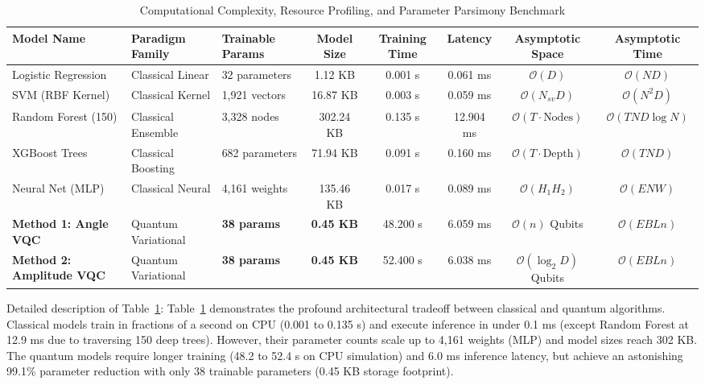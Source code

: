 \documentclass{ieeeaccess}
\begin{document}
\begin{table}[!t]
\caption{Computational Complexity, Resource Profiling, and Parameter Parsimony Benchmark}
\label{tab:computational_footprint}
\centering
\begin{tabular*}{\textwidth}{@{\extracolsep{\fill}}lllccccc@{}}
\toprule
\textbf{Model Name} & \textbf{Paradigm Family} & \textbf{Trainable Params} & \textbf{Model Size} & \textbf{Training Time} & \textbf{Latency} & \textbf{Asymptotic Space} & \textbf{Asymptotic Time} \\
\midrule
Logistic Regression         & Classical Linear   & 32 parameters      & 1.12 KB   & 0.001 s   & 0.061 ms  & $\mathcal{O}(D)$           & $\mathcal{O}(ND)$ \\
SVM (RBF Kernel)            & Classical Kernel   & 1,921 vectors      & 16.87 KB  & 0.003 s   & 0.059 ms  & $\mathcal{O}(N_{sv}D)$     & $\mathcal{O}(N^2 D)$ \\
Random Forest (150)         & Classical Ensemble & 3,328 nodes        & 302.24 KB & 0.135 s   & 12.904 ms & $\mathcal{O}(T \cdot \text{Nodes})$ & $\mathcal{O}(TND \log N)$ \\
XGBoost Trees               & Classical Boosting & 682 parameters     & 71.94 KB  & 0.091 s   & 0.160 ms  & $\mathcal{O}(T \cdot \text{Depth})$ & $\mathcal{O}(TND)$ \\
Neural Net (MLP)            & Classical Neural   & 4,161 weights      & 135.46 KB & 0.017 s   & 0.089 ms  & $\mathcal{O}(H_1 H_2)$     & $\mathcal{O}(ENW)$ \\
\midrule
\textbf{Method 1: Angle VQC}& Quantum Variational& \textbf{38 params} & \textbf{0.45 KB} & 48.200 s & 6.059 ms  & $\mathcal{O}(n)$ Qubits    & $\mathcal{O}(EBLn)$ \\
\textbf{Method 2: Amplitude VQC}& Quantum Variational& \textbf{38 params}& \textbf{0.45 KB}& 52.400 s & 6.038 ms  & $\mathcal{O}(\log_2 D)$ Qubits & $\mathcal{O}(EBLn)$ \\
\bottomrule
\end{tabular*}
\end{table}

Detailed description of Table~\ref{tab:computational_footprint}: Table~\ref{tab:computational_footprint} demonstrates the profound architectural tradeoff between classical and quantum algorithms. Classical models train in fractions of a second on CPU (0.001 to 0.135 s) and execute inference in under 0.1 ms (except Random Forest at 12.9 ms due to traversing 150 deep trees). However, their parameter counts scale up to 4,161 weights (MLP) and model sizes reach 302 KB. The quantum models require longer training (48.2 to 52.4 s on CPU simulation) and 6.0 ms inference latency, but achieve an astonishing 99.1\% parameter reduction with only 38 trainable parameters (0.45 KB storage footprint).
\end{document}

